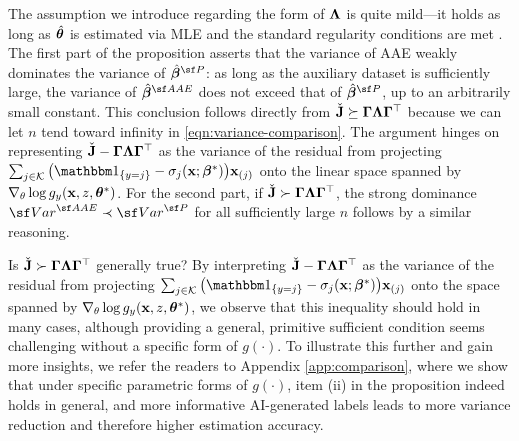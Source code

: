 The assumption we introduce regarding the form of $ \bm{\Lambda} $ is quite mild—it holds as long as $ \hat{\bm{\theta}} $ is estimated via MLE and the standard regularity conditions are met \citep{van2000asymptotic}. 
The first part of the proposition asserts that the variance of AAE weakly dominates the variance of $ \hat{\betavec}^{\sf P} $: as long as the auxiliary dataset is sufficiently large, the variance of $ \hat{\betavec}^{\sf AAE} $ does not exceed that of $ \hat{\betavec}^{\sf P} $, up to an arbitrarily small constant. This conclusion follows directly from $ \check{\mathbf{J}} \succeq \bm{\Gamma}\bm{\Lambda}\bm{\Gamma}^{\top} $ because we can let $ n $ tend toward infinity in \eqref{eqn:variance-comparison}. The argument hinges on representing $ \check{\mathbf{J}} - \bm{\Gamma}\bm{\Lambda}\bm{\Gamma}^{\top} $ as the variance of the residual from projecting $ \sum_{j\in \Kscr}\big(\ind_{\{y = j\}} - \sigma_{j}(\x; \betavec^*)\big)\x_{(j)} $ onto the linear space spanned by $ \nabla_{\theta} \log g_y(\mathbf{x}, z, \bm{\theta}^*) $.
For the second part, if $ \check{\mathbf{J}} \succ \bm{\Gamma}\bm{\Lambda}\bm{\Gamma}^{\top} $, the strong dominance $ {\sf Var}^{\sf AAE} \prec {\sf Var}^{\sf P} $ for all sufficiently large $ n $ follows by a similar reasoning.

Is $ \check{\mathbf{J}} \succ \bm{\Gamma}\bm{\Lambda}\bm{\Gamma}^{\top} $ generally true? By interpreting $ \check{\mathbf{J}} - \bm{\Gamma}\bm{\Lambda}\bm{\Gamma}^{\top} $ as the variance of the residual from projecting $ \sum_{j\in \Kscr}\big(\ind_{\{y = j\}} - \sigma_{j}(\x; \betavec^*)\big)\x_{(j)} $ onto the space spanned by $ \nabla_{\theta} \log g_y(\mathbf{x}, z, \bm{\theta}^*) $, we observe that this inequality should hold in many cases, although providing a general, primitive sufficient condition seems challenging without a specific form of $g(\cdot)$. To illustrate this further and gain more insights, we refer the readers to Appendix \ref{app:comparison}, 
where we show that under specific parametric forms of $g(\cdot)$, item (ii) in the proposition indeed holds in general, and more informative AI-generated labels leads to more variance reduction and therefore higher estimation accuracy.


